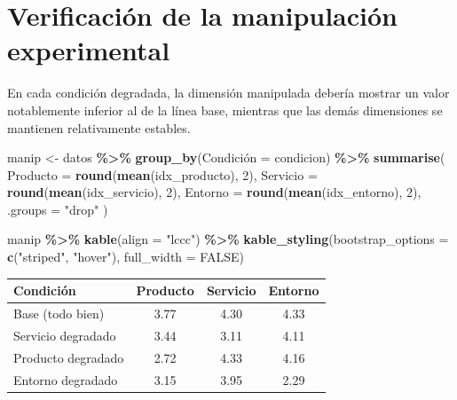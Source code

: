 \documentclass[
  spanish,
]{article}
\newenvironment{Shaded}{\begin{snugshade}}{\end{snugshade}}
\newcommand{\AttributeTok}[1]{\textcolor[rgb]{0.13,0.29,0.53}{#1}}
\newcommand{\ConstantTok}[1]{\textcolor[rgb]{0.56,0.35,0.01}{#1}}
\newcommand{\DecValTok}[1]{\textcolor[rgb]{0.00,0.00,0.81}{#1}}
\newcommand{\FunctionTok}[1]{\textcolor[rgb]{0.13,0.29,0.53}{\textbf{#1}}}
\newcommand{\NormalTok}[1]{#1}
\newcommand{\OtherTok}[1]{\textcolor[rgb]{0.56,0.35,0.01}{#1}}
\newcommand{\SpecialCharTok}[1]{\textcolor[rgb]{0.81,0.36,0.00}{\textbf{#1}}}
\newcommand{\StringTok}[1]{\textcolor[rgb]{0.31,0.60,0.02}{#1}}
\begin{document}
\section{Verificación de la manipulación
experimental}\label{verificaciuxf3n-de-la-manipulaciuxf3n-experimental}

En cada condición degradada, la dimensión manipulada debería mostrar un
valor notablemente inferior al de la línea base, mientras que las demás
dimensiones se mantienen relativamente estables.

\begin{Shaded}
\begin{Highlighting}[]
\NormalTok{manip }\OtherTok{\textless{}{-}}\NormalTok{ datos }\SpecialCharTok{\%\textgreater{}\%}
  \FunctionTok{group\_by}\NormalTok{(Condición }\OtherTok{=}\NormalTok{ condicion) }\SpecialCharTok{\%\textgreater{}\%}
  \FunctionTok{summarise}\NormalTok{(}
    \AttributeTok{Producto =} \FunctionTok{round}\NormalTok{(}\FunctionTok{mean}\NormalTok{(idx\_producto), }\DecValTok{2}\NormalTok{),}
    \AttributeTok{Servicio =} \FunctionTok{round}\NormalTok{(}\FunctionTok{mean}\NormalTok{(idx\_servicio), }\DecValTok{2}\NormalTok{),}
    \AttributeTok{Entorno  =} \FunctionTok{round}\NormalTok{(}\FunctionTok{mean}\NormalTok{(idx\_entorno), }\DecValTok{2}\NormalTok{),}
    \AttributeTok{.groups  =} \StringTok{"drop"}
\NormalTok{  )}

\NormalTok{manip }\SpecialCharTok{\%\textgreater{}\%}
  \FunctionTok{kable}\NormalTok{(}\AttributeTok{align =} \StringTok{"lccc"}\NormalTok{) }\SpecialCharTok{\%\textgreater{}\%}
  \FunctionTok{kable\_styling}\NormalTok{(}\AttributeTok{bootstrap\_options =} \FunctionTok{c}\NormalTok{(}\StringTok{"striped"}\NormalTok{, }\StringTok{"hover"}\NormalTok{),}
                \AttributeTok{full\_width =} \ConstantTok{FALSE}\NormalTok{)}
\end{Highlighting}
\end{Shaded}

\begin{longtable}[t]{lccc}
\toprule
Condición & Producto & Servicio & Entorno\\
\midrule
Base (todo bien) & 3.77 & 4.30 & 4.33\\
Servicio degradado & 3.44 & 3.11 & 4.11\\
Producto degradado & 2.72 & 4.33 & 4.16\\
Entorno degradado & 3.15 & 3.95 & 2.29\\
\bottomrule
\end{longtable}
\end{document}
